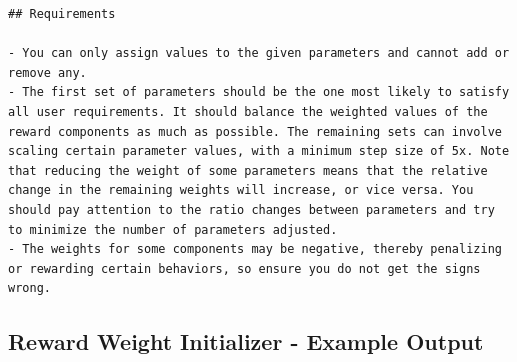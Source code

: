 \documentclass{article}
\begin{document}
\begin{verbatim}
## Requirements

- You can only assign values to the given parameters and cannot add or remove any.
- The first set of parameters should be the one most likely to satisfy all user requirements. It should balance the weighted values of the reward components as much as possible. The remaining sets can involve scaling certain parameter values, with a minimum step size of 5x. Note that reducing the weight of some parameters means that the relative change in the remaining weights will increase, or vice versa. You should pay attention to the ratio changes between parameters and try to minimize the number of parameters adjusted.
- The weights for some components may be negative, thereby penalizing or rewarding certain behaviors, so ensure you do not get the signs wrong.

\end{verbatim}

\subsection{Reward Weight Initializer - Example Output}
\end{document}
